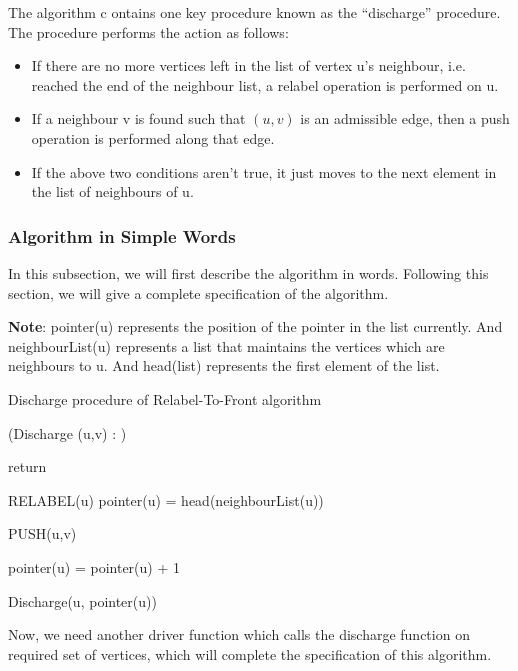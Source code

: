 \documentclass[BTech]{iitmdiss}
\begin{document}
	      The algorithm c	ontains one key procedure known as the ``discharge'' procedure. The procedure performs the action as follows:
	      \begin{itemize}
	       \item 
		If there are no more vertices left in the list of vertex u's neighbour, i.e. reached the end of the neighbour list, a relabel operation
		is performed on u.
		\item	
		  If a neighbour v is found such that $(u,v)$ is an admissible edge, then a push operation is performed along that edge.
		\item
		  If the above two conditions aren't true, it just moves to the next element in the list of neighbours of u.
	      \end{itemize}
	      
	      \subsubsection{Algorithm in Simple Words}
		In this subsection, we will first describe the algorithm in words. Following this section, we will give a complete specification of the 
		algorithm.
		
		
	      
	      \textbf{Note}: pointer(u) represents the position of the pointer in the list currently. And neighbourList(u) represents a list that 
	      maintains the vertices which are neighbours to u. And head(list) represents the first element of the list. \\
	      
	      \begin{algorithm}[H]
	       \caption{Discharge procedure of Relabel-To-Front algorithm}
	       \Begin(Discharge {(u,v) :} )
	       {
		  {
		      return \;
		  
		  }
		  {
		      RELABEL(u) \;
		      pointer(u) = head(neighbourList(u)) \;
		  }
		  {
		      PUSH(u,v) \;
		  
		  }
		  \Else
		  {
		    pointer(u) = pointer(u) + 1 \;
		  
		  }
		  Discharge(u, pointer(u)) \;
	       }
	      \end{algorithm}
	      
	      Now, we need another driver function which calls the discharge function on required set of vertices, which will complete the specification
	      of this algorithm. \\
	      
\end{document}
